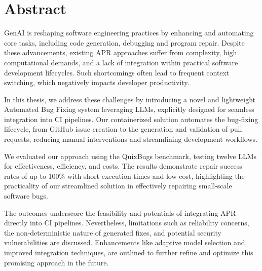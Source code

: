 \thispagestyle{empty}%

\section*{Abstract}
\ac{GenAI} is reshaping software engineering practices by enhancing and automating core tasks, including code generation, debugging and program repair. Despite these advancements, existing \ac{APR} approaches suffer from complexity, high computational demands, and a lack of integration within practical software development lifecycles. Such shortcomings often lead to frequent context switching, which negatively impacts developer productivity.

In this thesis, we address these challenges by introducing a novel and lightweight Automated Bug Fixing system leveraging \acp{LLM}, explicitly designed for seamless integration into \ac{CI} pipelines. Our containerized solution automates the bug-fixing lifecycle, from GitHub issue creation to the generation and validation of pull requests, reducing manual interventions and streamlining development workflows.

We evaluated our approach using the QuixBugs benchmark, testing twelve LLMs for effectiveness, efficiency, and costs. The results demonstrate repair success rates of up to 100\% with short execution times and low cost, highlighting the practicality of our streamlined solution in effectively repairing small-scale software bugs. 

The outcomes underscore the feasibility and potentials of integrating APR directly into \ac{CI} pipelines. Nevertheless, limitations such as reliability concerns, the non-deterministic nature of generated fixes, and potential security vulnerabilities are discussed. Enhancements like adaptive model selection and improved integration techniques, are outlined to further refine and optimize this promising approach in the future.
